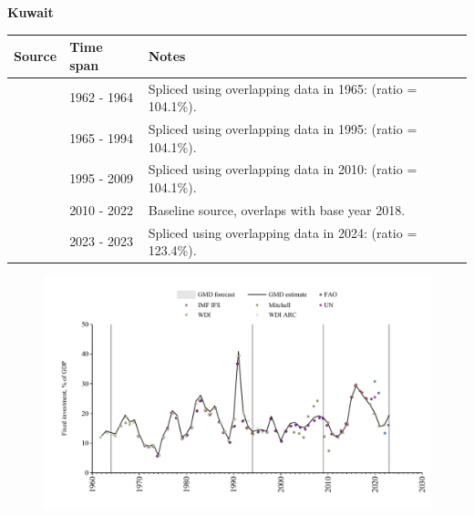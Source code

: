 \documentclass[12pt,a4paper,landscape]{article}
\begin{document}
\begin{adjustbox}{max totalsize={\paperwidth}{\paperheight},center}
\begin{minipage}[t][\textheight][t]{\textwidth}
\vspace*{0.5cm}
{}
\begin{center}
{\Large\bfseries Kuwait}
\end{center}
\vspace{0.5cm}
\begin{table}[H]
\centering
\small
\begin{tabular}{|l|l|l|}
\hline
\textbf{Source} & \textbf{Time span} & \textbf{Notes} \\
\hline
\rowcolor{white}\cite{WDI_ARC}& 1962 - 1964 &Spliced using overlapping data in 1965: (ratio = 104.1\%).\\
\rowcolor{lightgray}\cite{WDI}& 1965 - 1994 &Spliced using overlapping data in 1995: (ratio = 104.1\%).\\
\rowcolor{white}\cite{UN}& 1995 - 2009 &Spliced using overlapping data in 2010: (ratio = 104.1\%).\\
\rowcolor{lightgray}\cite{WDI}& 2010 - 2022 &Baseline source, overlaps with base year 2018.\\
\rowcolor{white}\cite{FAO}& 2023 - 2023 &Spliced using overlapping data in 2024: (ratio = 123.4\%).\\
\hline
\end{tabular}
\end{table}
\begin{figure}[H]
\centering
\includegraphics[width=\textwidth,height=0.6\textheight,keepaspectratio]{graphs/KWT_finv_GDP.pdf}
\end{figure}
\end{minipage}
\end{adjustbox}
\end{document}
